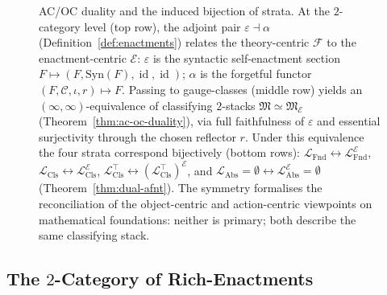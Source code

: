 \documentclass[11pt]{article}
\theoremstyle{plain}
\theoremstyle{definition}
\newcommand{\cF}{\mathcal{F}}
\newcommand{\cC}{\mathcal{C}}
\newcommand{\fM}{\mathfrak{M}}
\newcommand{\LFnd}{\mathcal{L}_{\mathrm{Fnd}}}
\newcommand{\LCls}{\mathcal{L}_{\mathrm{Cls}}}
\newcommand{\LClsMax}{\mathcal{L}_{\mathrm{Cls}}^{\top}}
\newcommand{\LAbs}{\mathcal{L}_{\mathrm{Abs}}}
\newcommand{\Syn}{\mathrm{Syn}}
\newcommand{\cE}{\mathcal{E}}
\newcommand{\fME}{\fM_{\cE}}
\newcommand{\LAbsE}{\LAbs^{\cE}}
\newcommand{\LClsE}{\LCls^{\cE}}
\newcommand{\LClsMaxE}{(\LClsMax)^{\cE}}
\newcommand{\LFndE}{\LFnd^{\cE}}
\DeclareMathOperator{\id}{id}
\begin{document}
\begin{figure}[ht]
\caption{AC/OC duality and the induced bijection of strata. At the $2$-category level (top row), the adjoint pair $\varepsilon \dashv \alpha$ (Definition~\ref{def:enactments}) relates the theory-centric $\cF$ to the enactment-centric $\cE$: $\varepsilon$ is the syntactic self-enactment section $F \mapsto (F, \Syn(F), \id, \id)$; $\alpha$ is the forgetful functor $(F, \cC, \iota, r) \mapsto F$. Passing to gauge-classes (middle row) yields an $(\infty, \infty)$-equivalence of classifying $2$-stacks $\fM \simeq \fME$ (Theorem~\ref{thm:ac-oc-duality}), via full faithfulness of $\varepsilon$ and essential surjectivity through the chosen reflector $r$. Under this equivalence the four strata correspond bijectively (bottom rows): $\LFnd \leftrightarrow \LFndE$, $\LCls \leftrightarrow \LClsE$, $\LClsMax \leftrightarrow \LClsMaxE$, and $\LAbs = \emptyset \leftrightarrow \LAbsE = \emptyset$ (Theorem~\ref{thm:dual-afnt}). The symmetry formalises the reconciliation of the object-centric and action-centric viewpoints on mathematical foundations: neither is primary; both describe the same classifying stack.}
\label{fig:ac-oc-duality}
\end{figure}

\subsection{\texorpdfstring{The $2$-Category of Rich-Enactments}{The 2-Category of Rich-Enactments}}
\end{document}
